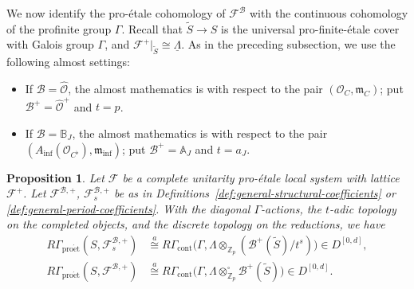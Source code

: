 \documentclass[11pt]{article}
\newtheorem{proposition}[theorem]{Proposition}
\theoremstyle{definition}
\newcommand{\Zp}{\mathbb Z_p}
\newcommand{\cO}{\mathcal O}
\newcommand{\cF}{\mathcal F}
\newcommand{\proet}{\mathrm{pro\acute et}}
\newcommand{\acong}{\mathrel{\overset{a}{\cong}}}
\begin{document}
We now identify the pro-\'etale cohomology of $\cF^{\mathscr B}$
with the continuous cohomology of the profinite group \(\Gamma\). 
Recall that $\widetilde{S}\to S$ is the universal pro-finite-\'etale cover with Galois group $\Gamma$, and $\cF^+|_{\widetilde{S}}\cong\underline{\Lambda}$. 
As in the preceding subsection, we use the following almost settings:
\begin{itemize}
\item If \(\mathscr{B}=\widehat{\mathscr{O}}\), the almost mathematics is with respect to the pair
\((\cO_C, \mathfrak{m}_C)\); put \(\mathscr B^+=\widehat{\mathscr O}^+\) and \(t=p\).
\item If \(\mathscr{B}=\mathbb{B}_J\), the almost mathematics is with respect to the pair \((A_{\inf}(\cO_{C^\flat}), \mathfrak{m}_{\inf})\); put \(\mathscr B^+=\mathbb A_J\) and \(t=a_J\).   
\end{itemize} 
\begin{proposition}%
\label{prop:geometric-almost-Cartan-Leray}
\label{prop:structural-almost-Cartan-Leray}
Let $\cF$ be a complete unitarity pro-\'etale local system with lattice $\cF^+$. 
Let $\cF^{\mathscr{B}, +}$, $\cF^{\mathscr{B}, +}_s$ be as in Definitions~\ref{def:general-structural-coefficients} or \ref{def:general-period-coefficients}. 
With the diagonal \(\Gamma\)-actions, the \(t\)-adic topology
on the completed objects, and the discrete topology on
the reductions, we have
\begin{align}
 R\Gamma_{\proet}(S,\mathcal F_s^{\mathscr B,+})
 &\acong R\Gamma_{\mathrm{cont}}\bigl(\Gamma,
 \Lambda\otimes_{\Zp}(\mathscr B^+(\widetilde{S})/t^s)\bigr)
       \in D^{[0,d]},\\
 R\Gamma_{\proet}(S,\mathcal F^{\mathscr B,+})
 &\acong R\Gamma_{\mathrm{cont}}\bigl(\Gamma,
 \Lambda\otimes_{\Zp}^{\square}\mathscr B^+(\widetilde{S})\bigr)
       \in D^{[0,d]}.
\end{align}
\end{proposition}
\end{document}
